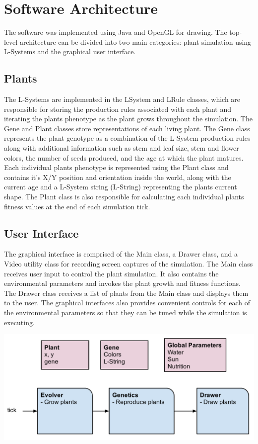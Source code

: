 \documentclass[conference]{acmsiggraph}
\begin{document}
\section{Software Architecture}

The software was implemented using Java and OpenGL for drawing. The top-level
architecture can be divided into two main categories: plant simulation using
L-Systems and the graphical user interface.

\subsection{Plants}

The L-Systems are implemented in the LSystem and LRule classes, which are
responsible for storing the production rules associated with each plant and
iterating the plants phenotype as the plant grows throughout the simulation. The
Gene and Plant classes store representations of each living plant. The Gene
class represents the plant genotype as a combination of the L-System production
rules along with additional information such as stem and leaf size, stem and
flower colors, the number of seeds produced, and the age at which the plant
matures. Each individual plants phenotype is represented using the Plant class
and contains it's X/Y position and orientation inside the world, along with the
current age and a L-System string (L-String) representing the plants current
shape. The Plant class is also responsible for calculating each individual
plants fitness values at the end of each simulation tick.

\subsection{User Interface}

The graphical interface is comprised of the Main class, a Drawer class, and a
Video utility class for recording screen captures of the simulation. The Main
class receives user input to control the plant simulation. It also contains the
environmental parameters and invokes the plant growth and fitness functions. The
Drawer class receives a list of plants from the Main class and displays them to
the user. The graphical interfaces also provides convenient controls for each of
the environmental parameters so that they can be tuned while the simulation is
executing.

\includegraphics[width=\columnwidth]{images/architecture.png}
\end{document}
